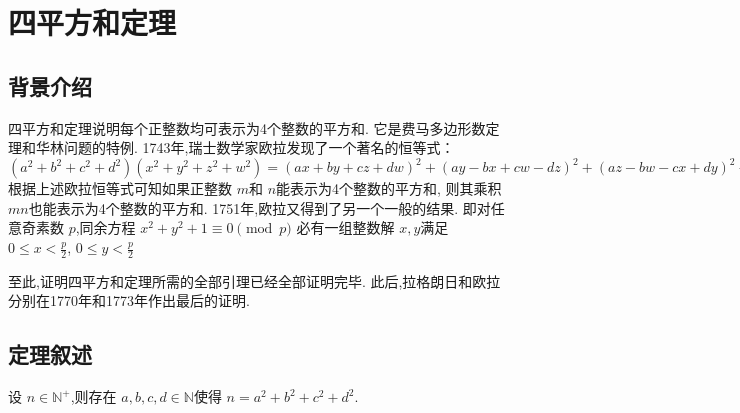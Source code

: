 \documentclass[main]{subfiles}
\begin{document}
\renewcommand{\filename}{No.10Theorem}%
\section{四平方和定理}
\subsection{背景介绍}
四平方和定理说明每个正整数均可表示为4个整数的平方和.
它是费马多边形数定理和华林问题的特例.
1743年,瑞士数学家欧拉发现了一个著名的恒等式：
 \((a^2+b^2+c^2+d^2)(x^2+y^2+z^2+w^2)=(ax+by+cz+dw)^2+(ay-bx+cw-dz)^2+(az-bw-cx+dy)^2+(aw+bz-cy-dx)^2\)
根据上述欧拉恒等式可知如果正整数 \(m\)和 \(n\)能表示为4个整数的平方和,
则其乘积 \(mn\)也能表示为4个整数的平方和.
1751年,欧拉又得到了另一个一般的结果.
即对任意奇素数 \(p\),同余方程
 \(x^2+y^2+1 \equiv 0\pmod p\)
必有一组整数解 \(x,y\)满足 \(0 \le x<\frac{p}{2}\), \(0 \le y<\frac{p}{2}\)

至此,证明四平方和定理所需的全部引理已经全部证明完毕.
此后,拉格朗日和欧拉分别在1770年和1773年作出最后的证明.

\subsection{定理叙述}
\begin{theorem}\label{the:1}
	设 \(n \in \mathbb{N}^+\),则存在 \(a,b,c,d \in \mathbb{N}\)使得 \(n=a^2 +b^2 + c^2 + d^2\).
\end{theorem}
\end{document}
